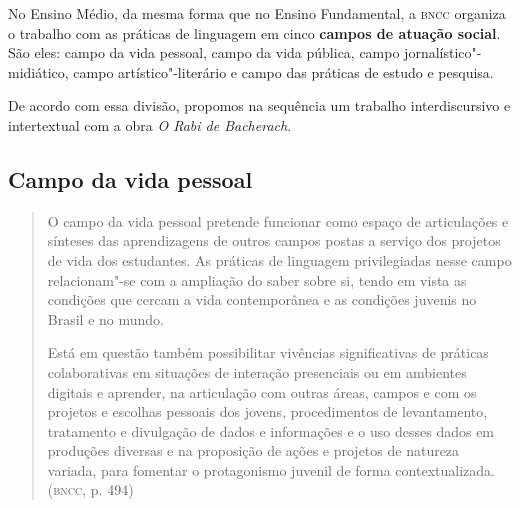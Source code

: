 \documentclass[12pt]{extarticle}
\begin{document}

No Ensino Médio, da mesma forma que no Ensino Fundamental, a \textsc{bncc}
organiza o trabalho com as práticas de linguagem em cinco \textbf{campos
de atuação social}. São eles: campo da vida pessoal, campo da vida
pública, campo jornalístico"-midiático, campo artístico"-literário e campo
das práticas de estudo e pesquisa.

De acordo com essa divisão, propomos na sequência um trabalho
interdiscursivo e intertextual com a obra \emph{O Rabi de Bacherach}.

\subsection{Campo da vida pessoal}

\begin{quote}
O campo da vida pessoal pretende funcionar como espaço de articulações
e sínteses das aprendizagens de outros campos postas a serviço dos
projetos de vida dos estudantes. As práticas de linguagem privilegiadas
nesse campo relacionam"-se com a ampliação do saber sobre si, tendo em
vista as condições que cercam a vida contemporânea e as condições
juvenis no Brasil e no mundo.

Está em questão também possibilitar vivências significativas de práticas
colaborativas em situações de interação presenciais ou em ambientes
digitais e aprender, na articulação com outras áreas, campos e com os
projetos e escolhas pessoais dos jovens, procedimentos de levantamento,
tratamento e divulgação de dados e informações e o uso desses dados em
produções diversas e na proposição de ações e projetos de natureza
variada, para fomentar o protagonismo juvenil de forma
contextualizada. (\textsc{bncc}, p. 494)
\end{quote}
\end{document}
